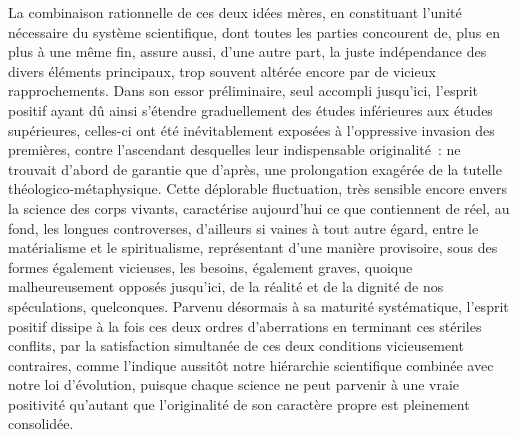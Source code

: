 \documentclass[french,twoside]{book} %
\begin{document}
La combinaison rationnelle de ces deux idées mères, en constituant l’unité nécessaire du système scientifique, dont toutes les parties concourent de, plus en plus à une même fin, assure aussi, d’une autre part, la juste indépendance des divers éléments principaux, trop souvent altérée encore par de vicieux rapprochements. Dans son essor préliminaire, seul accompli jusqu’ici, l’esprit positif ayant dû ainsi s’étendre graduellement des études inférieures aux études supérieures, celles-ci ont été inévitablement exposées à l’oppressive invasion des premières, contre l’ascendant desquelles leur indispensable originalité : ne trouvait d’abord de garantie que d’après, une prolongation exagérée de la tutelle théologico-métaphysique. Cette déplorable fluctuation, très sensible encore envers la science des corps vivants, caractérise aujourd’hui ce que contiennent de réel, au fond, les longues controverses, d’ailleurs si vaines à tout autre égard, entre le matérialisme et le spiritualisme, représentant d’une manière provisoire, sous des formes également vicieuses, les besoins, également graves, quoique malheureusement opposés jusqu’ici, de la réalité et de la dignité de nos spéculations, quelconques. Parvenu désormais à sa maturité systématique, l’esprit positif dissipe à la fois ces deux ordres d’aberrations en terminant ces stériles conflits, par la satisfaction simultanée de ces deux conditions vicieusement contraires, comme l’indique aussitôt notre hiérarchie scientifique combinée avec notre loi d’évolution, puisque chaque science ne peut parvenir à une vraie positivité qu’autant que l’originalité de son caractère propre est pleinement consolidée.\par
\end{document}
